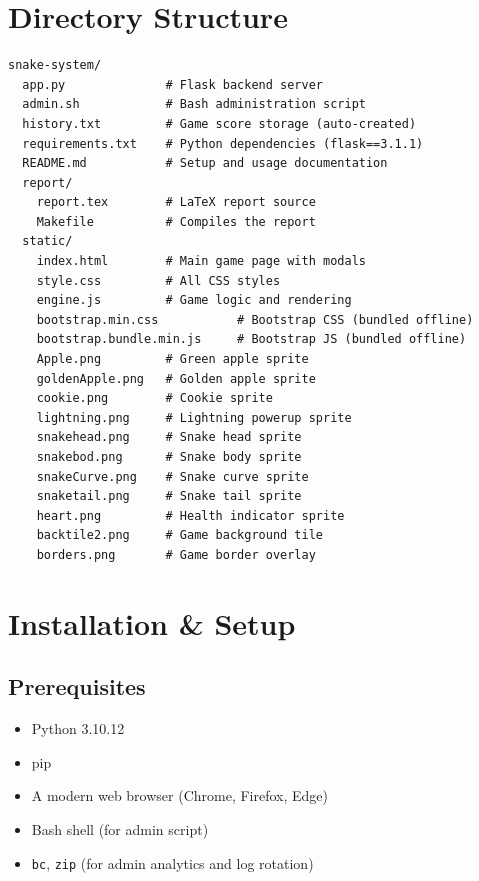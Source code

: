 \documentclass[12pt,a4paper]{article}
\begin{document}
\section{Directory Structure}

\begin{lstlisting}
snake-system/
  app.py              # Flask backend server
  admin.sh            # Bash administration script
  history.txt         # Game score storage (auto-created)
  requirements.txt    # Python dependencies (flask==3.1.1)
  README.md           # Setup and usage documentation
  report/
    report.tex        # LaTeX report source
    Makefile          # Compiles the report
  static/
    index.html        # Main game page with modals
    style.css         # All CSS styles
    engine.js         # Game logic and rendering
    bootstrap.min.css           # Bootstrap CSS (bundled offline)
    bootstrap.bundle.min.js     # Bootstrap JS (bundled offline)
    Apple.png         # Green apple sprite
    goldenApple.png   # Golden apple sprite
    cookie.png        # Cookie sprite
    lightning.png     # Lightning powerup sprite
    snakehead.png     # Snake head sprite
    snakebod.png      # Snake body sprite
    snakeCurve.png    # Snake curve sprite
    snaketail.png     # Snake tail sprite
    heart.png         # Health indicator sprite
    backtile2.png     # Game background tile
    borders.png       # Game border overlay
\end{lstlisting}

\section{Installation \& Setup}

\subsection{Prerequisites}

\begin{itemize}
    \item Python 3.10.12
    \item pip
    \item A modern web browser (Chrome, Firefox, Edge)
    \item Bash shell (for admin script)
    \item \texttt{bc}, \texttt{zip} (for admin analytics and log rotation)
\end{itemize}
\end{document}
